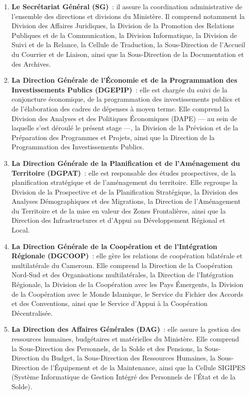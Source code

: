 \documentclass[12pt, a4paper, oneside]{report}
\begin{document}
\begin{enumerate}
	
	\item \textbf{Le Secrétariat Général (SG)}~: il assure la coordination administrative
	de l'ensemble des directions et divisions du Ministère. Il comprend notamment la
	Division des Affaires Juridiques, la Division de la Promotion des Relations Publiques
	et de la Communication, la Division Informatique, la Division de Suivi et de la
	Relance, la Cellule de Traduction, la Sous-Direction de l'Accueil du Courrier et de
	Liaison, ainsi que la Sous-Direction de la Documentation et des Archives.
	
	\item \textbf{La Direction Générale de l'Économie et de la Programmation des
		Investissements Publics (DGEPIP)}~: elle est chargée du suivi de la conjoncture
	économique, de la programmation des investissements publics et de l'élaboration des
	cadres de dépenses à moyen terme. Elle comprend la Division des Analyses et des
	Politiques Économiques (DAPE) --- au sein de laquelle s'est déroulé le présent
	stage ---, la Division de la Prévision et de la Préparation des Programmes et
	Projets, ainsi que la Direction de la Programmation des Investissements Publics.
	
	\item \textbf{La Direction Générale de la Planification et de l'Aménagement du
		Territoire (DGPAT)}~: elle est responsable des études prospectives, de la planification
	stratégique et de l'aménagement du territoire. Elle regroupe la Division de la
	Prospective et de la Planification Stratégique, la Division des Analyses
	Démographiques et des Migrations, la Direction de l'Aménagement du Territoire et
	de la mise en valeur des Zones Frontalières, ainsi que la Direction des
	Infrastructures et d'Appui au Développement Régional et Local.
	
	\item \textbf{La Direction Générale de la Coopération et de l'Intégration Régionale
		(DGCOOP)}~: elle gère les relations de coopération bilatérale et multilatérale du
	Cameroun. Elle comprend la Direction de la Coopération Nord-Sud et des
	Organisations multilatérales, la Direction de l'Intégration Régionale, la Division
	de la Coopération avec les Pays Émergents, la Division de la Coopération avec le
	Monde Islamique, le Service du Fichier des Accords et des Conventions, ainsi que
	le Service d'Appui à la Coopération Décentralisée.
	
	\item \textbf{La Direction des Affaires Générales (DAG)}~: elle assure la gestion
	des ressources humaines, budgétaires et matérielles du Ministère. Elle comprend la
	Sous-Direction des Personnels, de la Solde et des Pensions, la Sous-Direction du
	Budget, la Sous-Direction des Ressources Humaines, la Sous-Direction de
	l'Équipement et de la Maintenance, ainsi que la Cellule SIGIPES (Système
	Informatique de Gestion Intégré des Personnels de l'État et de la Solde).
	
\end{enumerate}
\end{document}
